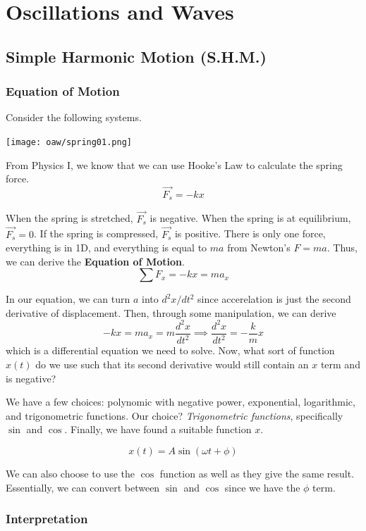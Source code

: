 \chapter{Oscillations and Waves}

\section{Simple Harmonic Motion (S.H.M.)}

\subsection{Equation of Motion}

Consider the following systems.

\begin{center}
\texttt{[image: oaw/spring01.png]}
\end{center}

From Physics I, we know that we can use Hooke's Law to calculate the spring force. \[ \vec{F_s} = -kx \]

When the spring is stretched, $\vec{F_s}$ is negative. When the spring is at equilibrium,
$\vec{F_s} = 0$. If the spring is compressed, $\vec{F_s}$ is positive. There is only one force,
everything is in 1D, and everything is equal to $ma$ from Newton's $F = ma$. Thus, we can
derive the \textbf{Equation of Motion}. \[ \sum F_x = -kx = ma_x \]

In our equation, we can turn $a$ into $d^2x / dt^2$ since accerelation is just the second
derivative of displacement. Then, through some manipulation, we can derive
\[ -kx = ma_x = m\frac{d^2x}{dt^2} \implies \frac{d^2x}{dt^2} = -\frac{k}{m}x \]
which is a differential equation we need to solve. Now, what sort of function $x(t)$ do we 
use such that its second derivative would still contain an $x$ term and is negative?

We have a few choices: polynomic with negative power, exponential, logarithmic, and trigonometric
functions. Our choice? \textit{Trigonometric functions}, specifically $\sin$ and $\cos$. Finally,
we have found a suitable function $x$.

\[ x(t) = A\sin(\omega t + \phi) \]

We can also choose to use the $\cos$ function as well as they give the same result. Essentially,
we can convert between $\sin$ and $\cos$ since we have the $\phi$ term.

\subsection{Interpretation}

